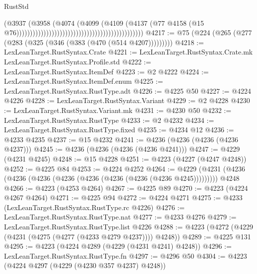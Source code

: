 \begin{lexlean}{RustStd}
\begin{coremodule}
                                                                                  (@3937
                                                                                    (@3958
                                                                                      (@4074
                                                                                        (@4099
                                                                                          (@4109
                                                                                            (@4137
                                                                                              (@77
                                                                                                @4158
                                                                                                (@15
                                                                                                  @76)))))))))))))))))))))))))))))))))))))))))))))))
@4217 := @75 (@224 (@265 (@277 (@283 (@325 (@346 (@383 (@470 (@514 @4207)))))))))
@4218 := LexLeanTarget.RustSyntax.Crate
@4221 := LexLeanTarget.RustSyntax.Crate.mk LexLeanTarget.RustSyntax.Profile.std
@4222 := LexLeanTarget.RustSyntax.ItemDef
@4223 := @2 @4222
@4224 := LexLeanTarget.RustSyntax.ItemDef.enum
@4225 := LexLeanTarget.RustSyntax.RustType.adt
@4226 := @4225 @50
@4227 := @4224 @4226
@4228 := LexLeanTarget.RustSyntax.Variant
@4229 := @2 @4228
@4230 := LexLeanTarget.RustSyntax.Variant.mk
@4231 := @4230 @50
@4232 := LexLeanTarget.RustSyntax.RustType
@4233 := @2 @4232
@4234 := LexLeanTarget.RustSyntax.RustType.fixed
@4235 := @4234 @12
@4236 := @4233 @4235
@4237 := @15 @4232
@4241 := @4236 (@4236 (@4236 (@4236 @4237)))
@4245 := @4236 (@4236 (@4236 (@4236 @4241)))
@4247 := @4229 (@4231 @4245)
@4248 := @15 @4228
@4251 := @4223 (@4227 (@4247 @4248))
@4252 := @4225 @84
@4253 := @4224 @4252
@4264 := @4229 (@4231 (@4236 (@4236 (@4236 (@4236 (@4236 (@4236 (@4236 (@4236 @4245))))))))) @4248
@4266 := @4223 (@4253 @4264)
@4267 := @4225 @89
@4270 := @4223 (@4224 @4267 @4264)
@4271 := @4225 @94
@4272 := @4224 @4271
@4275 := @4233 (LexLeanTarget.RustSyntax.RustType.rc @4226)
@4276 := LexLeanTarget.RustSyntax.RustType.nat
@4277 := @4233 @4276
@4279 := LexLeanTarget.RustSyntax.RustType.list @4226
@4288 := @4223 (@4272 (@4229 (@4231 (@4275 (@4277 (@4233 @4279 @4237)))) @4248))
@4289 := @4225 @131
@4295 := @4223 (@4224 @4289 (@4229 (@4231 @4241) @4248))
@4296 := LexLeanTarget.RustSyntax.RustType.fn
@4297 := @4296 @50
@4304 := @4223 (@4224 @4297 (@4229 (@4230 @357 @4237) @4248))

\end{coremodule}
\end{lexlean}
